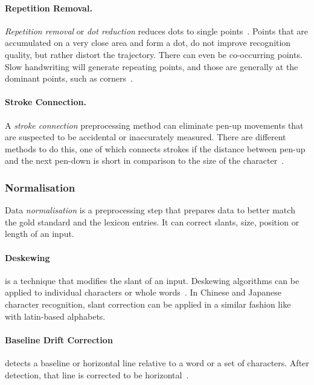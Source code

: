 \paragraph{Repetition Removal.}
\label{sec:repetitionremoval}
\emph{Repetition removal} or \emph{dot reduction} reduces dots to single 
points~. Points that are accumulated on a very close 
area and form a dot, do not improve recognition quality, but rather distort the 
trajectory. There can even be co-occurring points. Slow handwriting will generate
repeating points, and those are generally at the dominant points, such as
corners~.

\paragraph{Stroke Connection.}
\label{sec:strokeconnection}
A \emph{stroke connection} preprocessing method can eliminate pen-up movements
that are suspected to be accidental or inaccurately measured. There are different
methods to do this, one of which connects strokes if the distance between pen-up
and the next pen-down is short in comparison to the size of the 
character~.

\subsubsection{Normalisation} 
\label{sec:normalisation}
Data \emph{normalisation} is a preprocessing step that prepares data to better
match the gold standard and the lexicon entries. It can correct slants, size, 
position or length of an input.

\paragraph{Deskewing}
is a technique that modifies the slant of an input. Deskewing 
algorithms can be applied to individual characters or 
whole words~. In Chinese and Japanese character recognition, 
slant correction can be applied in a similar fashion like with latin-based alphabets.

\paragraph{Baseline Drift Correction} 
detects a baseline or horizontal line relative
to a word or a set of characters. After detection, that line is corrected to
be horizontal~.

